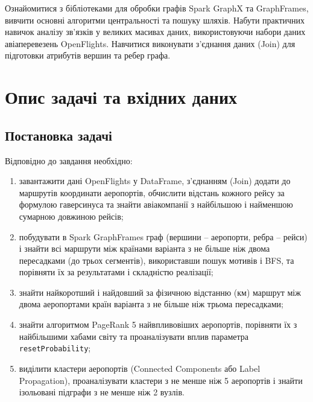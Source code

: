 \documentclass{iasa-lab}
\begin{document}
\maketitle

\tableofcontents
\clearpage


Ознайомитися з бібліотеками для обробки графів Spark GraphX та GraphFrames, вивчити основні алгоритми центральності та пошуку шляхів. Набути практичних навичок аналізу зв'язків у великих масивах даних, використовуючи набори даних авіаперевезень OpenFlights. Навчитися виконувати з'єднання даних (Join) для підготовки атрибутів вершин та ребер графа.

\section{Опис задачі та вхідних даних}

\subsection{Постановка задачі}

Відповідно до завдання необхідно:
\begin{enumerate}
  \item завантажити дані OpenFlights у DataFrame, з'єднанням (Join) додати до маршрутів координати аеропортів, обчислити відстань кожного рейсу за формулою гаверсинуса та знайти авіакомпанії з найбільшою і найменшою сумарною довжиною рейсів;
  \item побудувати в Spark GraphFrames граф (вершини -- аеропорти, ребра -- рейси) і знайти всі маршрути між країнами варіанта з не більше ніж двома пересадками (до трьох сегментів), використавши пошук мотивів і BFS, та порівняти їх за результатами і складністю реалізації;
  \item знайти найкоротший і найдовший за фізичною відстанню (км) маршрут між двома аеропортами країн варіанта з не більше ніж трьома пересадками;
  \item знайти алгоритмом PageRank 5 найвпливовіших аеропортів, порівняти їх з найбільшими хабами світу та проаналізувати вплив параметра \texttt{resetProbability};
  \item виділити кластери аеропортів (Connected Components або Label Propagation), проаналізувати кластери з не менше ніж 5 аеропортів і знайти ізольовані підграфи з не менше ніж 2 вузлів.
\end{enumerate}
\end{document}
